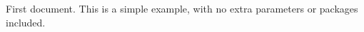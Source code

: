 \documentclass{article}
\begin{document}
First document. This is a simple example, with no 
extra parameters or packages included.
\end{document}
